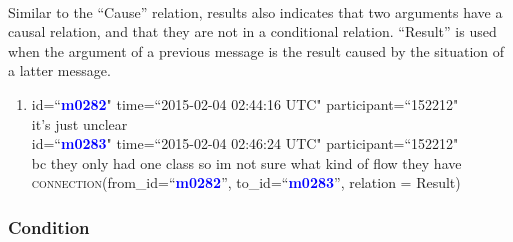 \documentclass{article}
\begin{document}
\paragraph{}
Similar to the ``Cause'' relation, results also indicates that two arguments have a causal relation, and that they are not in a conditional relation. ``Result'' is used when the argument of a previous message is the result caused by the situation of a latter message.
\begin{enumerate}[resume]
\item id=``\textbf{\textcolor{blue}{m0282}}" time=``2015-02-04 02:44:16 UTC" participant=``152212"\\
it’s just unclear\\
id=``\textbf{\textcolor{blue}{m0283}}" time=``2015-02-04 02:46:24 UTC" participant=``152212"\\
bc they only had one class so im not sure what kind of flow they have\\
\textsc{connection}(from\_id=``\textbf{\textcolor{blue}{m0282}}'', to\_id=``\textbf{\textcolor{blue}{m0283}}'', relation = Result)\\
\end{enumerate}

\subsubsection{Condition}
\end{document}
